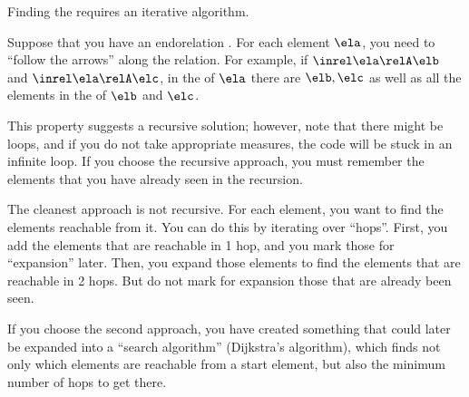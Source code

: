 
\begin{hint}
    Finding the  requires an iterative algorithm.

    Suppose that you have an endorelation \relA.
    For each element $\ela$, you need to ``follow the arrows'' along the relation.
    For example, if  $\inrel \ela \relA \elb$ and  $\inrel \ela \relA \elc$, in the  of $\ela$ there are $\elb, \elc$ as well as all the elements in the  of $\elb$ and $\elc$.

    This property suggests a recursive solution; however, note that there might be loops, and if you do not take appropriate measures, the code will be stuck in an infinite loop.
    If you choose the recursive approach, you must remember the elements that you have already seen in the recursion.

    The cleanest approach is not recursive.
    For each element, you want to find the elements reachable from it.
    You can do this by iterating over ``hops''.
    First, you add the elements that are reachable in 1 hop, and you mark those for ``expansion'' later.
    Then, you expand those elements to find the elements that are reachable in 2 hops.
    But do not mark for expansion those that are already been seen.

    If you choose the second approach, you have created something that could later be expanded into a ``search algorithm'' (Dijkstra's algorithm), which finds not only which elements are reachable from a start element, but also the minimum number of hops to get there.
\end{hint}
